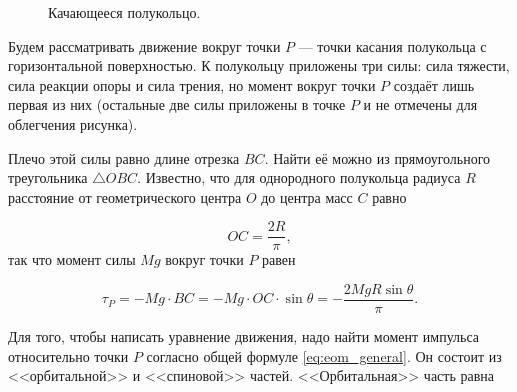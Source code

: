 \documentclass[a4paper,12pt]{article}
\newcommand*\marktheangle[6][]{
            \draw[thick,arcnode={#6},#1] let \p2=($(#3)-(#2)$),%
                        \p3=($(#4)-(#2)$),%
                        \n2 = {atan2(\x2,\y2)},%
                        \n3 = {atan2(\x3,\y3)}%
                        in ($(\n2:#5)+(#2)$) arc (\n2:\n3:#5);
            }
\begin{document}
\begin{figure}[h]
  \centering
  \caption{Качающееся полукольцо.}
  \label{fig:semihoop}
\end{figure}

Будем рассматривать движение вокруг точки $P$ --- точки касания
полукольца с горизонтальной поверхностью. К полукольцу приложены три
силы: сила тяжести, сила реакции опоры и сила трения, но момент вокруг
точки $P$ создаёт лишь первая из них (остальные две силы приложены в
точке $P$ и не отмечены для облегчения рисунка). 

Плечо этой силы равно длине отрезка $BC$. Найти её можно из
прямоугольного треугольника $\triangle OBC$. Известно, что для
однородного полукольца радиуса $R$ расстояние от геометрического
центра $O$ до центра масс $C$ равно

\begin{equation}
  \label{eq:OC}
  OC = \frac{2R}{\pi},
\end{equation}
так что момент силы $Mg$ вокруг точки $P$ равен

\begin{equation}
  \label{eq:torque_mg}
  \tau_P = -Mg \cdot BC = -Mg \cdot OC \cdot \sin \theta = -\frac{2MgR \sin
    \theta}{\pi}.  
\end{equation}

Для того, чтобы написать уравнение движения, надо найти момент
импульса относительно точки $P$ согласно общей формуле
\eqref{eq:eom_general}. Он состоит из <<орбитальной>> и <<спиновой>>
частей. <<Орбитальная>> часть равна
\end{document}
